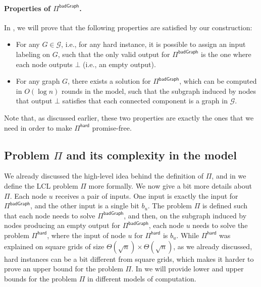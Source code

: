 \documentclass[11pt]{article}
\newcommand{\lbadgraph}{\mathsf {badGraph}}
\newcommand{\lhard}{\mathsf {hard}}
\begin{document}
\paragraph{\boldmath Properties of $\Pi^{\lbadgraph}$.}
In , we will prove that the following properties are satisfied by our construction:
\begin{itemize}
	\item For any $G \in \mathcal{G}$, i.e., for any hard instance, it is possible to assign an input labeling on $G$, such that the only valid output for $\Pi^{\lbadgraph}$ is the one where each node outputs $\bot$ (i.e., an empty output).
	\item For any graph $G$, there exists a solution for $\Pi^{\lbadgraph}$, which can be computed in $O(\log n)$ rounds in the \local model, such that the subgraph induced by nodes that output $\bot$ satisfies that each connected component is a graph in $\mathcal{G}$.
\end{itemize}
Note that, as discussed earlier, these two properties are exactly the ones that we need in order to make  $\Pi^{\lhard}$ promise-free.

\subsection{Problem \texorpdfstring{\boldmath$\Pi$}{Pi} and its complexity in the \local model}

We already discussed the high-level idea behind the definition of $\Pi$, and in  we  define the LCL problem $\Pi$ more formally. We now give a bit more details about $\Pi$. 
Each node $u$ receives a pair of inputs. One input is exactly the input for $\Pi^{\lbadgraph}$, and the other input is a single bit $b_u$. The problem $\Pi$ is defined such that each node needs to solve $\Pi^{\lbadgraph}$, and then, on the subgraph  induced by nodes producing an empty output for $\Pi^{\lbadgraph}$, each node $u$ needs to solve the problem $\Pi^{\lhard}$, where the input of node $u$ for $\Pi^{\lhard}$ is $b_u$. While $\Pi^{\lhard}$ was explained on square grids of size $\Theta(\sqrt{n}) \times \Theta(\sqrt{n})$, as we already discussed, hard instances can be a bit different from square grids, which makes it harder to prove an upper bound for the problem $\Pi$.
In  we will provide lower and upper bounds for the problem $\Pi$ in different models of computation. 
\end{document}

